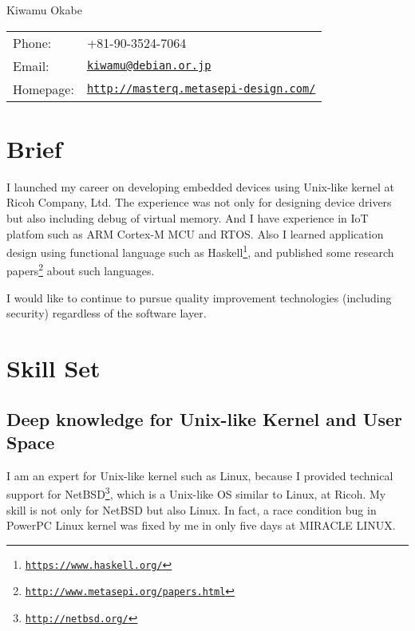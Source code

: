 \documentclass[letterpaper]{article}
\def\name{Kiwamu Okabe}
\begin{document}
{\huge \name}


\vspace{0.25in}

\begin{minipage}{0.3\linewidth}
  \begin{tabular}{ll}
    Phone: & +81-90-3524-7064 \\
    Email: & \href{mailto:kiwamu@debian.or.jp}{\tt kiwamu@debian.or.jp} \\
    Homepage: & \href{http://masterq.metasepi-design.com/}{\tt http://masterq.metasepi-design.com/} \\
  \end{tabular}
\end{minipage}

\section*{Brief}

I launched my career on developing embedded devices using Unix-like kernel at Ricoh Company, Ltd. The experience was not only for designing device drivers but also including debug of virtual memory. And I have experience in IoT platfom such as ARM Cortex-M MCU and RTOS. Also I learned application design using functional language such as Haskell\footnote{\href{https://www.haskell.org/}{\tt https://www.haskell.org/}}, and published some research papers\footnote{\href{http://www.metasepi.org/papers.html}{\tt http://www.metasepi.org/papers.html}} about such languages.

I would like to continue to pursue quality improvement technologies (including security) regardless of the software layer.

\section*{Skill Set}

\subsection*{Deep knowledge for Unix-like Kernel and User Space}

I am an expert for Unix-like kernel such as Linux, because I provided technical support for NetBSD\footnote{\href{http://netbsd.org/}{\tt http://netbsd.org/}}, which is a Unix-like OS similar to Linux, at Ricoh. My skill is not only for NetBSD but also Linux. In fact, a race condition bug in PowerPC Linux kernel was fixed by me in only five days at MIRACLE LINUX.
\end{document}
